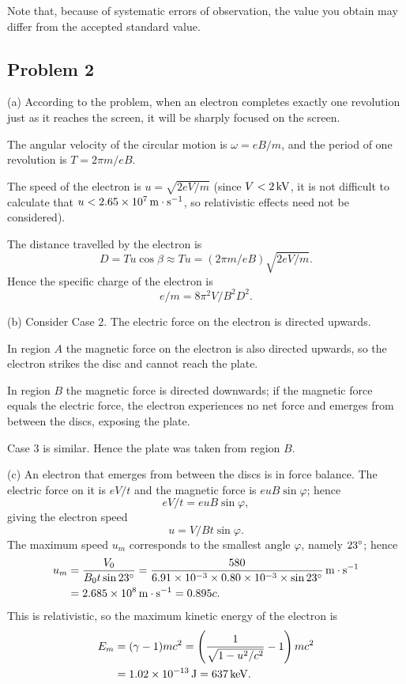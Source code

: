 Note that, because of systematic errors of observation, the value you obtain may differ from the accepted standard value.

\subsection*{Problem 2}

(a) According to the problem, when an electron completes exactly one revolution just as it reaches the screen, it will be sharply focused on the screen.

The angular velocity of the circular motion is $\omega=eB/m$, and the period of one revolution is $T=2\pi m/eB$.

The speed of the electron is $u=\sqrt{2eV/m}$ (since $V<2\,\mathrm{kV}$, it is not difficult to calculate that $u<2.65\times10^7\,\mathrm{m\cdot s^{-1}}$, so relativistic effects need not be considered).

The distance travelled by the electron is
\begin{equation*}
D=Tu\cos\beta\approx Tu=(2\pi m/eB)\sqrt{2eV/m} .
\end{equation*}
Hence the specific charge of the electron is
\begin{equation*}
e/m=8\pi^2V/B^2D^2 .
\end{equation*}

(b) Consider Case 2. The electric force on the electron is directed upwards.

In region $A$ the magnetic force on the electron is also directed upwards, so the electron strikes the disc and cannot reach the plate.

In region $B$ the magnetic force is directed downwards; if the magnetic force equals the electric force, the electron experiences no net force and emerges from between the discs, exposing the plate.

Case 3 is similar. Hence the plate was taken from region $B$.

(c) An electron that emerges from between the discs is in force balance. The electric force on it is $eV/t$ and the magnetic force is $euB\sin\varphi$; hence
\begin{equation*}
eV/t=euB\sin\varphi ,
\end{equation*}
giving the electron speed
\begin{equation*}
u=V/Bt\sin\varphi .
\end{equation*}
The maximum speed $u_m$ corresponds to the smallest angle $\varphi$, namely $23^{\circ}$; hence
\begin{align*}
u_m&=\frac{V_0}{B_0t\sin23^{\circ}}
=\frac{580}{6.91\times10^{-3}\times0.80\times10^{-3}\times\sin23^{\circ}}
\,\mathrm{m\cdot s^{-1}}\\
&=2.685\times10^8\,\mathrm{m\cdot s^{-1}}=0.895c .
\end{align*}
This is relativistic, so the maximum kinetic energy of the electron is
\begin{align*}
E_m&=(\gamma-1)mc^2
=\left(\frac{1}{\sqrt{1-u^2/c^2}}-1\right)mc^2\\
&=1.02\times10^{-13}\,\mathrm{J}=637\,\mathrm{keV} .
\end{align*}


